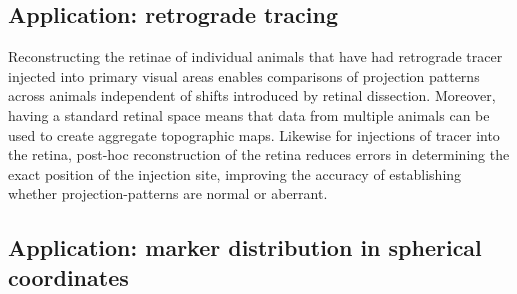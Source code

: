 \documentclass[10pt]{article}
\begin{document}

\subsection*{Application: retrograde tracing}

Reconstructing the retinae of individual animals that have had
retrograde tracer injected into primary visual areas enables
comparisons of projection patterns across animals independent of
shifts introduced by retinal dissection. Moreover, having a standard
retinal space means that data from multiple animals can be used to
create aggregate topographic maps. Likewise for injections of tracer
into the retina, post-hoc reconstruction of the retina reduces errors
in determining the exact position of the injection site, improving the
accuracy of establishing whether projection-patterns are normal or
aberrant.





\subsection*{Application: marker distribution in spherical coordinates}
\end{document}
